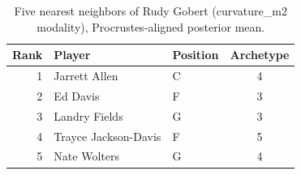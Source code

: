 \begin{table}[htbp]
  \centering\small
  \begin{tabular}{rllc}
    \toprule
    Rank & Player & Position & Archetype \\
    \midrule
    1 & Jarrett Allen & C & 4 \\
    2 & Ed Davis & F & 3 \\
    3 & Landry Fields & G & 3 \\
    4 & Trayce Jackson-Davis & F & 5 \\
    5 & Nate Wolters & G & 4 \\
    \bottomrule
  \end{tabular}
  \caption{Five nearest neighbors of Rudy Gobert (curvature_m2 modality), Procrustes-aligned posterior mean.}
  \label{tab:Rudy_Gobert_neighbors_curvature_m2}
\end{table}

